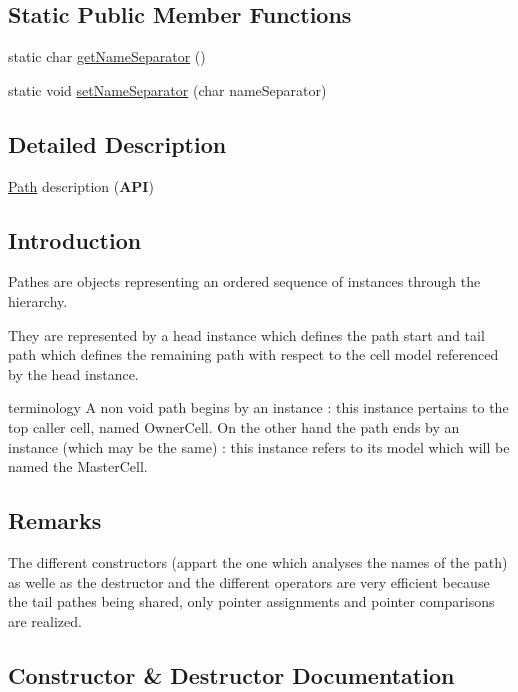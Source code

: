 \subsection*{Static Public Member Functions}
\begin{DoxyCompactItemize}
\item 
static char \mbox{\hyperlink{classHurricane_1_1Path_ac63015239df43b8c44a6d74a262eb3a2}{get\+Name\+Separator}} ()
\item 
static void \mbox{\hyperlink{classHurricane_1_1Path_a505231a4bf7e8041c7a01e482505cd7a}{set\+Name\+Separator}} (char name\+Separator)
\end{DoxyCompactItemize}


\subsection{Detailed Description}
\mbox{\hyperlink{classHurricane_1_1Path}{Path}} description ({\bfseries A\+PI}) 

\hypertarget{classHurricane_1_1Path_secPathIntro}{}\subsection{Introduction}\label{classHurricane_1_1Path_secPathIntro}
Pathes are objects representing an ordered sequence of instances through the hierarchy.

They are represented by a head instance which defines the path start and tail path which defines the remaining path with respect to the cell model referenced by the head instance.

terminology A non void path begins by an instance \+: this instance pertains to the top caller cell, named Owner\+Cell. On the other hand the path ends by an instance (which may be the same) \+: this instance refers to its model which will be named the Master\+Cell.\hypertarget{classHurricane_1_1Path_secPathRemarks}{}\subsection{Remarks}\label{classHurricane_1_1Path_secPathRemarks}
The different constructors (appart the one which analyses the names of the path) as welle as the destructor and the different operators are very efficient because the tail pathes being shared, only pointer assignments and pointer comparisons are realized. 

\subsection{Constructor \& Destructor Documentation}
\mbox{\label{classHurricane_1_1Path_ad3fe735dcb2ce630f89b98c039663c23}} 

